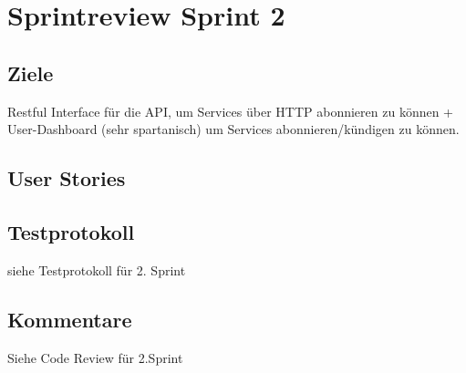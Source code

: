\chapter{Sprintreview Sprint 2}

\section{Ziele}
Restful Interface für die API, um Services über HTTP 
abonnieren zu können + User-Dashboard (sehr spartanisch)  um Services 
abonnieren/kündigen zu können.

\section{User Stories}





\newpage

\section{Testprotokoll}

siehe Testprotokoll für 2. Sprint

\section{Kommentare}

Siehe Code Review für 2.Sprint
